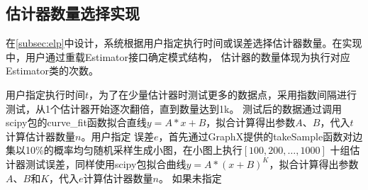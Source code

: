 \documentclass[master]{thesis-uestc}
\begin{document}
\subsection{估计器数量选择实现}
\label{subsec:elp-impl}
    在\ref{subsec:elp}中设计，系统根据用户指定执行时间或误差选择估计器数量。在实现中，用户通过重载Estimator接口确定模式结构，
估计器的数量体现为执行对应Estimator类的次数。

    用户指定执行时间$t$，为了在少量估计器时测试更多的数据点，采用指数间隔进行测试，从1个估计器开始逐次翻倍，直到数量达到1k。
测试后的数据通过调用scipy包的curve\_fit函数拟合直线$y = A*x+B$，拟合计算得出参数$A$、$B$，代入$t$计算估计器数量$n$。用户指定
误差$e$，首先通过GraphX提供的takeSample函数对边集以10\%的概率均匀随机采样生成小图，在小图上执行$[100,200,\ldots,1000]$
十组估计器测试误差，同样使用scipy包拟合曲线$y = A*(x+B)^K$，拟合计算得出参数$A$、$B$和$K$，代入$e$计算估计器数量$n$。
如果未指定
\begin{table}
    \caption{估计器选择调用主要函数}
    \label{tab:elp-func}
\end{table}
\end{document}
